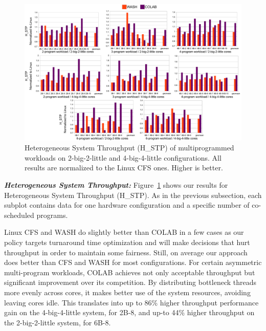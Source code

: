 \begin{figure}
\centering
\includegraphics[scale=0.4]{figures/HSTP_NEW.pdf}
\caption{Heterogeneous System Throughput (H\_STP) of multiprogrammed workloads on 2-big-2-little and 4-big-4-little configurations. All results are normalized to the Linux CFS ones. Higher is better.}
\label{M36W}
\end{figure} 
\textbf{\textit{Heterogeneous System Throughput:}}
Figure~\ref{M36W} shows our results for Heterogeneous System Throughput (H\_STP). As in the previous subsection, each subplot contains data for one hardware configuration and a specific number of co-scheduled programs.

Linux CFS and WASH do slightly better than COLAB in a few cases as our policy targets turnaround time optimization and will make decisions that hurt throughput in order to maintain some fairness. Still, on average our approach does better than CFS and WASH for most configurations. For certain asymmetric multi-program workloads, COLAB achieves not only acceptable throughput but significant improvement over its competition. By distributing bottleneck threads more evenly across cores, it makes better use of the system resources, avoiding leaving cores idle. This translates into up to 86\% higher throughput performance gain on the 4-big-4-little system, for 2B-8, and up-to 44\% higher throughput on the 2-big-2-little system, for 6B-8.

